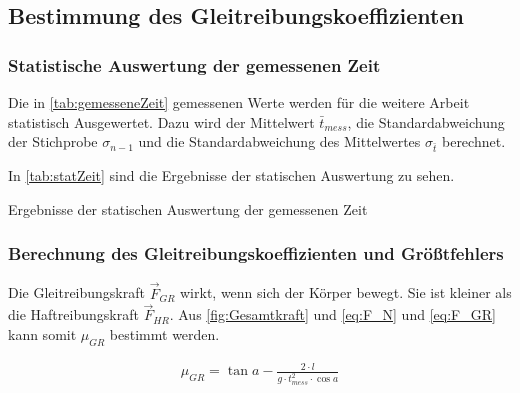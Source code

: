 \subsection{Bestimmung des Gleitreibungskoeffizienten}

\subsubsection{Statistische Auswertung der gemessenen Zeit}

Die in \autoref{tab:gemesseneZeit} gemessenen Werte werden für die weitere Arbeit statistisch Ausgewertet. Dazu wird der Mittelwert $\bar{t}_{mess}$, die Standardabweichung der Stichprobe $\sigma_{n-1}$ und die Standardabweichung des Mittelwertes $\sigma_{\bar{t}}$ berechnet.

In \autoref{tab:statZeit} sind die Ergebnisse der statischen Auswertung zu sehen.

\begin{table}[h]
    \center 
    \caption[Statistische Auswertung der gemessenen Zeit]{Ergebnisse der statischen Auswertung der gemessenen Zeit}
    
    \label{tab:statZeit}
\end{table}

\subsubsection{Berechnung des Gleitreibungskoeffizienten und Größtfehlers}

Die Gleitreibungskraft $\vec{F}_{GR}$ wirkt, wenn sich der Körper bewegt. Sie ist kleiner als die Haftreibungskraft $\vec{F}_{HR}$. Aus \autoref{fig:Gesamtkraft} und \autoref{eq:F_N} und \autoref{eq:F_GR} kann somit $\mu_{GR}$ bestimmt werden.

\begin{align}
  \mu_{GR} = \tan{a} - \frac{2\cdot l}{g \cdot t_{mess}^2 \cdot \cos{a}}
\end{align}

